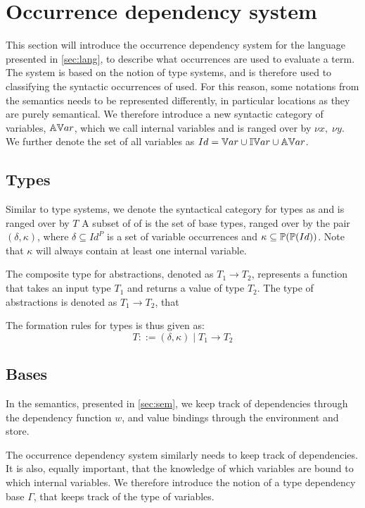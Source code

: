 \documentclass[../../master.tex]{subfiles}
\begin{document}
\section{Occurrence dependency system}
This section will introduce the occurrence dependency system for the language presented in \cref{sec:lang}, to describe what occurrences are used to evaluate a term.
The system is based on the notion of type systems, and is therefore used to classifying the syntactic occurrences of used.
For this reason, some notations from the semantics needs to be represented differently, in particular locations as they are purely semantical.
We therefore introduce a new syntactic category of variables, $\mathbb{AV}ar$, which we call internal variables and is ranged over by $\nu x,\;\nu y$.
We further denote the set of all variables as $Id=\mathbb{V}ar\cup\mathbb{IV}ar\cup\mathbb{AV}ar$.

\subsection{Types}
Similar to type systems, we denote the syntactical category for types as  and is ranged over by $T$
A subset of of  is the set of base types, ranged over by the pair $(\delta,\kappa)$, where $\delta\subseteq Id^P$ is a set of variable occurrences and $\kappa\subseteq\mathbb{P}(\mathbb{P}(Id))$.
Note that $\kappa$ will always contain at least one internal variable.

The composite type for abstractions, denoted as $T_1\rightarrow T_2$, represents a function that takes an input type $T_1$ and returns a value of type $T_2$.
The type of abstractions is denoted as $T_1\rightarrow T_2$, that 

The formation rules for types is thus given as:
$$T::=(\delta,\kappa)\mid T_1 \rightarrow T_2$$

\subsection{Bases}
In the semantics, presented in \cref{sec:sem}, we keep track of dependencies through the dependency function $w$, and value bindings through the environment and store.

The occurrence dependency system similarly needs to keep track of dependencies.
It is also, equally important, that the knowledge of which variables are bound to which internal variables.
We therefore introduce the notion of a type dependency base $\Gamma$, that keeps track of the type of variables.
\end{document}
